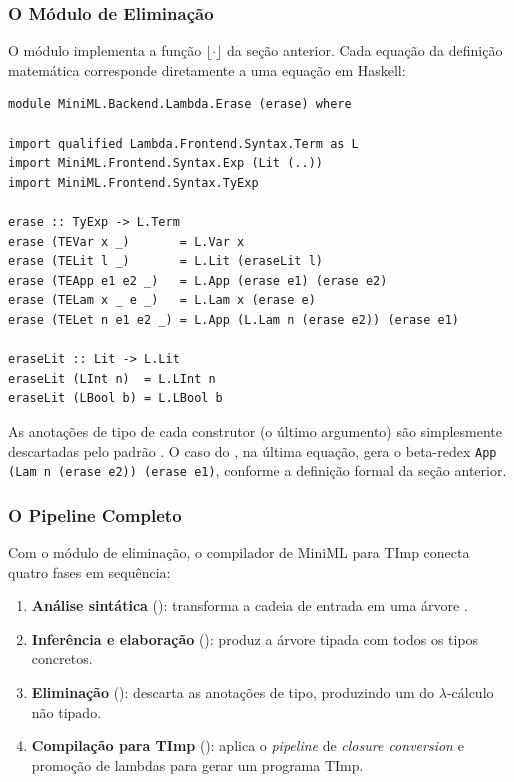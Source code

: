   \subsubsection{O Módulo de Eliminação}

  O módulo  implementa a função
  \(\lfloor \cdot \rfloor\) da seção anterior. Cada equação da definição
  matemática corresponde diretamente a uma equação em Haskell:

\begin{verbatim}
module MiniML.Backend.Lambda.Erase (erase) where

import qualified Lambda.Frontend.Syntax.Term as L
import MiniML.Frontend.Syntax.Exp (Lit (..))
import MiniML.Frontend.Syntax.TyExp

erase :: TyExp -> L.Term
erase (TEVar x _)       = L.Var x
erase (TELit l _)       = L.Lit (eraseLit l)
erase (TEApp e1 e2 _)   = L.App (erase e1) (erase e2)
erase (TELam x _ e _)   = L.Lam x (erase e)
erase (TELet n e1 e2 _) = L.App (L.Lam n (erase e2)) (erase e1)

eraseLit :: Lit -> L.Lit
eraseLit (LInt n)  = L.LInt n
eraseLit (LBool b) = L.LBool b
\end{verbatim}

  As anotações de tipo de cada construtor (o último argumento) são
  simplesmente descartadas pelo padrão \haskell{_}. O caso do
  , na última equação, gera o beta-redex
  \texttt{App (Lam n (erase e2)) (erase e1)}, conforme a definição
  formal da seção anterior.

  \subsubsection{O Pipeline Completo}

  Com o módulo de eliminação, o compilador de MiniML para TImp conecta
  quatro fases em sequência:

  \begin{enumerate}
    \item \textbf{Análise sintática} (): transforma a
      cadeia de entrada em uma árvore .
    \item \textbf{Inferência e elaboração} (): produz
      a árvore tipada  com todos os tipos concretos.
    \item \textbf{Eliminação} (): descarta as anotações
      de tipo, produzindo um  do $\lambda$-cálculo não tipado.
    \item \textbf{Compilação para TImp} (): aplica
      o \emph{pipeline} de \emph{closure conversion} e promoção de
      lambdas para gerar um programa TImp.
  \end{enumerate}

